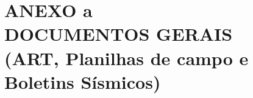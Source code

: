 \clearpage
\vspace*{\fill}
\section*{\centering ANEXO a \\ DOCUMENTOS GERAIS \\ (ART, Planilhas de campo e Boletins Sísmicos)}
\vspace*{\fill}
\clearpage
\newpage


